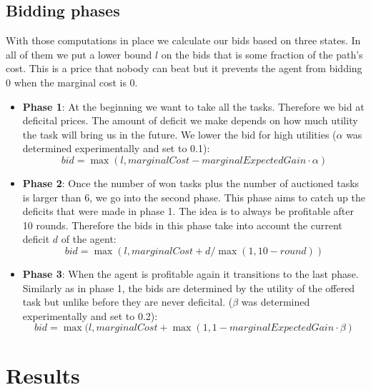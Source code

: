 \documentclass[11pt]{article}
\begin{document}
  \subsection{Bidding phases}

  With those computations in place we calculate our bids based on three states.
  In all of them we put a lower bound $l$ on the bids that is some fraction of the
  path's cost. This is a price that nobody can beat but it prevents the agent from
  bidding 0 when the marginal cost is 0.

  \begin{itemize}

    \item

    \textbf{Phase 1}: At the beginning we want to take all the tasks. Therefore we
    bid at deficital prices. The amount of deficit we make depends on how much
    utility the task will bring us in the future. We lower the bid for high
    utilities ($\alpha$ was determined experimentally and set to 0.1):
    $$
    bid = \max(l, marginalCost - marginalExpectedGain \cdot \alpha)
    $$

    \item

    \textbf{Phase 2}: Once the number of won tasks plus the number of auctioned
    tasks is larger than 6, we go into the second phase. This phase aims to catch
    up the deficits that were made in phase 1. The idea is to always be profitable
    after 10 rounds. Therefore the bids in this phase take into account the
    current deficit $d$ of the agent:
    $$
    bid = \max(l, marginalCost + d/\max(1, 10 - round))
    $$

    \item

    \textbf{Phase 3}: When the agent is profitable again it transitions to the
    last phase. Similarly as in phase 1, the bids are determined by the utility of
    the offered task but unlike before they are never deficital.
    ($\beta$ was determined experimentally and set to 0.2):
    $$
    bid = \max(l, marginalCost + \max(1, 1 - marginalExpectedGain \cdot \beta)
    $$


  \end{itemize}


  \section{Results}

\end{document}
